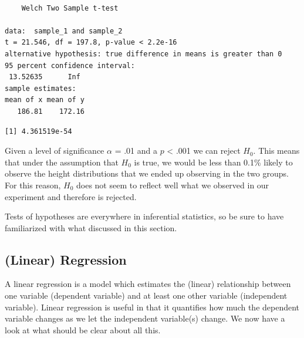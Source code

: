 \documentclass[
  letterpaper,
  DIV=11,
  numbers=noendperiod]{scrartcl}
\newenvironment{Shaded}{\begin{snugshade}}{\end{snugshade}}
\newcommand{\NormalTok}[1]{\textcolor[rgb]{0.00,0.23,0.31}{#1}}
\newcommand{\SpecialCharTok}[1]{\textcolor[rgb]{0.37,0.37,0.37}{#1}}
\begin{document}
\begin{verbatim}

    Welch Two Sample t-test

data:  sample_1 and sample_2
t = 21.546, df = 197.8, p-value < 2.2e-16
alternative hypothesis: true difference in means is greater than 0
95 percent confidence interval:
 13.52635      Inf
sample estimates:
mean of x mean of y 
   186.81    172.16 
\end{verbatim}

\begin{Shaded}
\end{Shaded}

\begin{verbatim}
[1] 4.361519e-54
\end{verbatim}

Given a level of significance \(\alpha\) = .01 and a \(p\) \textless{}
.001 we can reject \(H_0\). This means that under the assumption that
\(H_0\) is true, we would be less than 0.1\% likely to observe the
height distributions that we ended up observing in the two groups. For
this reason, \(H_0\) does not seem to reflect well what we observed in
our experiment and therefore is rejected.

\begin{tcolorbox}[enhanced jigsaw, bottomrule=.15mm, colframe=quarto-callout-important-color-frame, arc=.35mm, leftrule=.75mm, toptitle=1mm, toprule=.15mm, titlerule=0mm, breakable, opacityback=0, colbacktitle=quarto-callout-important-color!10!white, coltitle=black, bottomtitle=1mm, colback=white, title=\textcolor{quarto-callout-important-color}{\faExclamation}\hspace{0.5em}{Important}, left=2mm, rightrule=.15mm, opacitybacktitle=0.6]

Tests of hypotheses are everywhere in inferential statistics, so be sure
to have familiarized with what discussed in this section.

\end{tcolorbox}

\subsection{(Linear) Regression}\label{linear-regression}

A linear regression is a model which estimates the (linear) relationship
between one variable (dependent variable) and at least one other
variable (independent variable). Linear regression is useful in that it
quantifies how much the dependent variable changes as we let the
independent variable(s) change. We now have a look at what should be
clear about all this.
\end{document}
